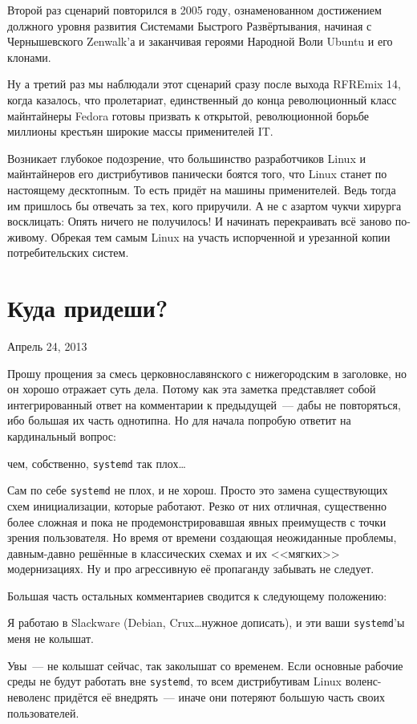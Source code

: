 Второй раз сценарий повторился в 2005 году, ознаменованном достижением должного уровня развития Системами Быстрого Развёртывания, начиная с Чернышевского Zenwalk'а и заканчивая героями Народной Воли Ubuntu и его клонами.

Ну а третий раз мы наблюдали этот сценарий сразу после выхода RFREmix 14, когда казалось, что пролетариат, единственный до конца революционный класс майнтайнеры Fedora готовы призвать к открытой, революционной борьбе миллионы крестьян широкие массы применителей IT.

Возникает глубокое подозрение, что большинство разработчиков Linux и майнтайнеров его дистрибутивов панически боятся того, что Linux станет по настоящему десктопным. То есть придёт на машины применителей. Ведь тогда им пришлось бы отвечать за тех, кого приручили. А не с азартом чукчи хирурга восклицать: Опять ничего не получилось! И начинать перекраивать всё заново по-живому. Обрекая тем самым Linux на участь испорченной и урезанной копии потребительских систем.

\section{Куда придеши?} 
\begin{timeline}Апрель 24, 2013\end{timeline}

Прошу прощения за смесь церковнославянского с нижегородским в заголовке, но он хорошо отражает суть дела. Потому как эта заметка представляет собой интегрированный ответ на комментарии к предыдущей~--- дабы не повторяться, ибо большая их часть однотипна. Но для начала попробую ответит на кардинальный вопрос:
\begin{shadequote}{}
чем, собственно, \texttt{systemd} так плох\dots
\end{shadequote}
Сам по себе \texttt{systemd} не плох, и не хорош. Просто это замена существующих схем инициализации, которые работают. Резко от них отличная, существенно более сложная и пока не продемонстрировавшая явных преимуществ с точки зрения пользователя. Но время от времени создающая неожиданные проблемы, давным-давно решённые в классических схемах и их <<мягких>> модернизациях. Ну и про агрессивную её пропаганду забывать не следует.

Большая часть остальных комментариев сводится к следующему положению:
\begin{shadequote}{}
Я работаю в Slackware (Debian, Crux\dots нужное дописать), и эти ваши \texttt{systemd}'ы меня не колышат.
\end{shadequote}
Увы~--- не колышат сейчас, так заколышат со временем. Если основные рабочие среды не будут работать вне \texttt{systemd}, то всем дистрибутивам Linux воленс-неволенс придётся её внедрять~--- иначе они потеряют большую часть своих пользователей.

